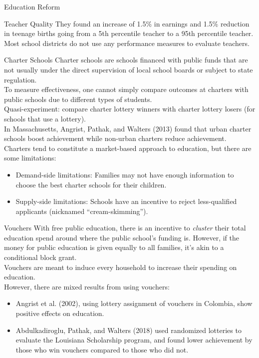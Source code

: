 \documentclass[8pt]{extarticle}
\begin{document}
\begin{problem}{Education Reform}
\begin{problem}{Teacher Quality}
      They found an increase of 1.5\% in earnings and 1.5\% reduction in teenage births going from a 5th percentile teacher to a 95th percentile teacher.\\

      Most school districts do not use any performance measures to evaluate teachers.
    \end{problem}
    \begin{problem}{Charter Schools}
      Charter schools are schools financed with public funds that are not usually under the direct supervision of local school boards or subject to state regulation.\\

      To measure effectiveness, one cannot simply compare outcomes at charters with public schools due to different types of students.\\

      Quasi-experiment: compare charter lottery winners with charter lottery losers (for schools that use a lottery).\\

      In Massachusetts, Angrist, Pathak, and Walters (2013) found that urban charter schools boost achievement while non-urban charters reduce achievement.\\

      Charters tend to constitute a market-based approach to education, but there are some limitations:
      \begin{itemize}
        \item Demand-side limitations: Families may not have enough information to choose the best charter schools for their children.
        \item Supply-side limitations: Schools have an incentive to reject less-qualified applicants (nicknamed ``cream-skimming'').
      \end{itemize}
    \end{problem}
    \begin{problem}{Vouchers}
      With free public education, there is an incentive to \textit{cluster} their total education spend around where the public school's funding is. However, if the money for public education is given equally to all families, it's akin to a conditional block grant.\\

      Vouchers are meant to induce every household to increase their spending on education.\\

      However, there are mixed results from using vouchers:
      \begin{itemize}
        \item Angrist et al. (2002), using lottery assignment of vouchers in Colombia, show positive effects on education.
        \item Abdulkadiroglu, Pathak, and Walters (2018) used randomized lotteries to evaluate the Louisiana Scholarship program, and found lower achievement by those who win vouchers compared to those who did not.
      \end{itemize}
    \end{problem}
  \end{problem}
\end{document}
